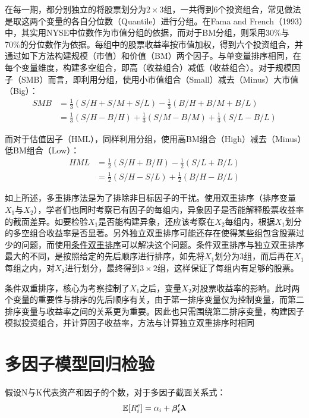 \documentclass[11pt]{article}
\begin{document}
在每一期，都分别独立的将股票划分为$2 \times 3$组，一共得到6个投资组合，常见做法是取这两个变量的各自分位数（Quantile）进行分组。在Fama and French（1993）中，其实用NYSE中位数作为市值分组的依据，而对于BM分组，则采用30\%与70\%的分位数作为依据。每组中的股票收益率按市值加权，得到六个投资组合，并通过如下方法构建规模（市值）和价值（BM）两个因子。与单变量排序相同，在每个变量维度，构建多空组合，即高（收益组合）减低（收益组合）。对于规模因子（SMB）而言，即利用分组，使用小市值组合（Small）减去（Minus）大市值（Big）：
\begin{align*}
    SMB &= \frac{1}{3}(S/H + S/M + S/L) - \frac{1}{3}(B/H + B/M + B/L) \\
    &= \frac{1}{3}(S/H-B/H) + \frac{1}{3}(S/M-B/M) + \frac{1}{3}(S/L-B/L)
\end{align*}

而对于估值因子（HML），同样利用分组，使用高BM组合（High）减去（Minus）低BM组合（Low）：
\begin{align*}
    HML &=  \frac{1}{2}(S/H + B/H) - \frac{1}{2}(S/L + B/L) \\
    &= \frac{1}{2}(S/H-S/L) + \frac{1}{2}(B/H-B/L)
\end{align*}

如上所述，多重排序法是为了排除非目标因子的干扰。使用双重排序（排序变量$X_1$与$X_2$），学者们也同时考察已有因子的每组内，异象因子是否能解释股票收益率的截面差异。如要检验$X_1$是否能构建异象，还应该考察在$X_2$每组内，根据$X_1$划分的多空组合收益率是否显著。另外独立双重排序可能还存在使得某些组包含股票过少的问题，而使用\uline{条件双重排序}可以解决这个问题。条件双重排序与独立双重排序最大的不同，是按照给定的先后顺序进行排序，如先将$X_1$划分为3组，而后再在$X_1$每组之内，对$X_2$进行划分，最终得到$3\times 2$组，这样保证了每组内有足够的股票。

条件双重排序，核心为考察控制了$X_1$之后，变量$X_2$对股票收益率的影响。此时两个变量的重要性与排序的先后顺序有关，由于第一排序变量仅为控制变量，而第二排序变量与收益率之间的关系更为重要。因此也只需围绕第二排序变量，构建因子模拟投资组合，并计算因子收益率，方法与计算独立双重排序时相同

\section{多因子模型回归检验}

假设N与K代表资产和因子的个数，对于多因子截面关系式：
\begin{equation*}
    \mathbb{E}[R_{i}^{e}] = \alpha_i + \bm{\beta_{i}' \lambda}
\end{equation*}
\end{document}
